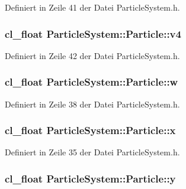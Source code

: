 Definiert in Zeile 41 der Datei Particle\-System.\-h.

\hypertarget{structParticleSystem_1_1Particle_a869ca2653700c9abed6982257d510b79}{
\subsubsection[{v4}]{\setlength{\rightskip}{0pt plus 5cm}cl\-\_\-float Particle\-System\-::\-Particle\-::v4}}\label{structParticleSystem_1_1Particle_a869ca2653700c9abed6982257d510b79}


Definiert in Zeile 42 der Datei Particle\-System.\-h.

\hypertarget{structParticleSystem_1_1Particle_a1ad443743569b3fe0419a68bc414b1da}{
\subsubsection[{w}]{\setlength{\rightskip}{0pt plus 5cm}cl\-\_\-float Particle\-System\-::\-Particle\-::w}}\label{structParticleSystem_1_1Particle_a1ad443743569b3fe0419a68bc414b1da}


Definiert in Zeile 38 der Datei Particle\-System.\-h.

\hypertarget{structParticleSystem_1_1Particle_afbcacc71d3d67d836801ca572906cba2}{
\subsubsection[{x}]{\setlength{\rightskip}{0pt plus 5cm}cl\-\_\-float Particle\-System\-::\-Particle\-::x}}\label{structParticleSystem_1_1Particle_afbcacc71d3d67d836801ca572906cba2}


Definiert in Zeile 35 der Datei Particle\-System.\-h.

\hypertarget{structParticleSystem_1_1Particle_ac34361f7e23b372bdfb7fad5ae8049c3}{
\subsubsection[{y}]{\setlength{\rightskip}{0pt plus 5cm}cl\-\_\-float Particle\-System\-::\-Particle\-::y}}\label{structParticleSystem_1_1Particle_ac34361f7e23b372bdfb7fad5ae8049c3}


